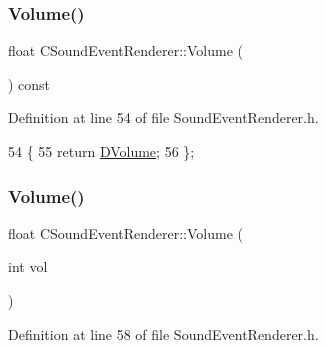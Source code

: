 \subsubsection{\texorpdfstring{Volume()}{Volume()}\hspace{0.1cm}{\footnotesize\ttfamily [1/2]}}
{\footnotesize\ttfamily float C\+Sound\+Event\+Renderer\+::\+Volume (\begin{DoxyParamCaption}{ }\end{DoxyParamCaption}) const\hspace{0.3cm}{\ttfamily [inline]}}



Definition at line 54 of file Sound\+Event\+Renderer.\+h.


\begin{DoxyCode}
54                             \{
55             \textcolor{keywordflow}{return} \hyperlink{classCSoundEventRenderer_a3812aeb93aef90635a7da72fc101c686}{DVolume};
56         \};
\end{DoxyCode}
\hypertarget{classCSoundEventRenderer_a7266c3416291f3802d6f3476a29285a2}{}\label{classCSoundEventRenderer_a7266c3416291f3802d6f3476a29285a2} 
\subsubsection{\texorpdfstring{Volume()}{Volume()}\hspace{0.1cm}{\footnotesize\ttfamily [2/2]}}
{\footnotesize\ttfamily float C\+Sound\+Event\+Renderer\+::\+Volume (\begin{DoxyParamCaption}\item[{int}]{vol }\end{DoxyParamCaption})\hspace{0.3cm}{\ttfamily [inline]}}



Definition at line 58 of file Sound\+Event\+Renderer.\+h.



